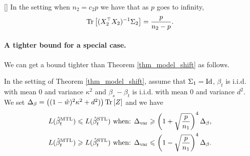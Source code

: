 \begin{lemma}\label{lem_minv}[]
	In the setting when $n_2 = c_2 p$ we have that as $p$ goes to infinity,
	\[ \operatorname{Tr}\left[(X_2^{\top}X_2)^{-1}\Sigma_2\right] = \frac{p}{n_2 - p}. \]
\end{lemma}


\paragraph{A tighter bound for a special case.} We can get a bound tighter than Theorem \ref{thm_model_shift} as follows.

	\begin{proposition}\label{prop_model_shift_tight}
		In the setting of Theorem \ref{thm_model_shift}, assume that $\Sigma_1 =\operatorname{Id}$,
		$\beta_t$ is i.i.d. with mean $0$ and variance $\kappa^2$ and $\beta_s - \beta_t$ is i.i.d. with mean $0$ and variance $d^2$.
		We set $\Delta_{\beta} = \left({(1 - \hat{w})^2 \kappa^2 + d^2)}\right) \operatorname{Tr}\left[Z\right]$
		and we have
		\begin{align*}
			L(\hat{\beta}_t^{\text{MTL}}) \leqslant L(\hat{\beta}_t^{\text{STL}}) \text{ when: } & \Delta_{\text{var}} \geqslant \left({1 + \sqrt{\frac{p}{n_1}}}\right)^4 \Delta_{\beta}, \\
			L(\hat{\beta}_t^{\text{MTL}}) \geqslant L(\hat{\beta}_t^{\text{STL}}) \text{ when: } & \Delta_{\text{var}} \leqslant \left({1 - \sqrt{\frac{p}{n_1}}}\right)^4 \Delta_{\beta}.
		\end{align*}
	\end{proposition}




